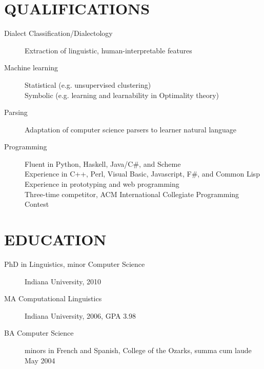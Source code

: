 
\section*{QUALIFICATIONS}
\begin{description}
  \item[Dialect Classification/Dialectology] Extraction of
    linguistic, human-interpretable features
  \item[Machine learning] Statistical (e.g. unsupervised clustering) \\
    Symbolic (e.g. learning and learnability in Optimality theory)
  \item[Parsing] Adaptation of computer science parsers to learner
    natural language
  \item[Programming] Fluent in Python, Haskell, Java/C\#, and Scheme \\
    Experience in C++, Perl, Visual Basic, Javascript, F\#, and
    Common Lisp \\
    Experience in prototyping and web programming \\
    Three-time competitor, ACM International Collegiate Programming
    Contest
\end{description}
\section*{EDUCATION}
\begin{description}
\item [PhD in Linguistics, minor Computer Science] Indiana University, 2010
\item [MA Computational Linguistics] Indiana University, 2006, GPA 3.98
\item[BA Computer Science] minors in French and Spanish,
		College of the Ozarks, summa cum laude May 2004
\end{description}
